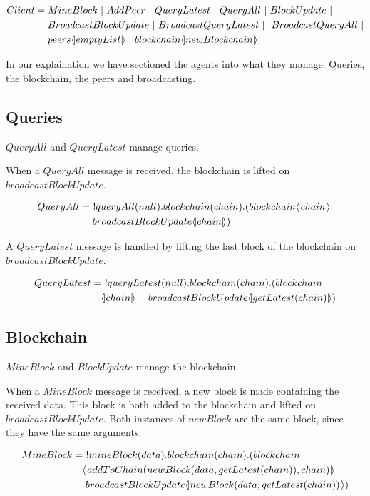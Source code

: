 \begin{align*}
	Client &= MineBlock\ |\ AddPeer\ |\ QueryLatest\ |\ QueryAll\ |\ BlockUpdate\ |\\
	&\quad \ BroadcastBlockUpdate\ |\ BroadcastQueryLatest\ |\ \ BroadcastQueryAll\ |\\
	&\quad \ peers\lift{}{emptyList}\ |\ blockchain\lift{}{newBlockchain}
\end{align*}

In our explaination we have sectioned the agents into what they manage: Queries, the blockchain, the peers and broadcasting.

\subsection{Queries}

$QueryAll$ and $QueryLatest$ manage queries.

When a $QueryAll$ message is received, the blockchain is lifted on $broadcastBlockUpdate$.

\begin{align*}
    QueryAll &=\ !queryAll(null).blockchain(chain).(blockchain\lift{}{chain}|\\
    &\quad \ broadcastBlockUpdate\lift{}{chain})
\end{align*}

A $QueryLatest$ message is handled by lifting the last block of the blockchain on $broadcastBlockUpdate$.

\begin{align*}
	QueryLatest &=\ !queryLatest(null).blockchain(chain).(blockchain\\
	&\quad \lift{}{chain}\ |\ \ broadcastBlockUpdate\lift{}{getLatest(chain)})
\end{align*}

\subsection{Blockchain}

$MineBlock$ and $BlockUpdate$ manage the blockchain.

When a $MineBlock$ message is received, a new block is made containing the received data.
This block is both added to the blockchain and lifted on $broadcastBlockUpdate$.
Both instances of $newBlock$ are the same block, since they have the same arguments.

\begin{align*}
    MineBlock &=\ !mineBlock(data).blockchain(chain).(blockchain\\
    &\quad  \langle \! | addToChain(newBlock(data,getLatest(chain)),chain) | \! \rangle|\\
    &\quad \ broadcastBlockUpdate \langle \! | newBlock(data, getLatest(chain)) | \! \rangle)
\end{align*}

